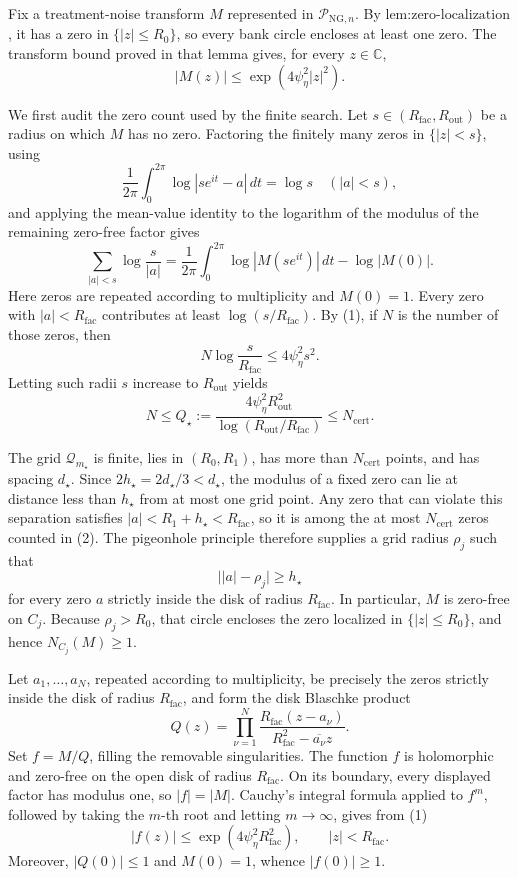 Fix a treatment-noise transform \(M\) represented in \(\mathcal P_{\mathrm{NG},n}\).  By \(\text{lem:zero-localization}\), it has a zero in \(\{|z|\le R_0\}\), so every bank circle encloses at least one zero.  The transform bound proved in that lemma gives, for every \(z\in\mathbb C\),
\[
 |M(z)|\le \exp(4\psi_{\eta}^2|z|^2). \tag{1}
\]

We first audit the zero count used by the finite search.  Let \(s\in(R_{\mathrm{fac}},R_{\mathrm{out}})\) be a radius on which \(M\) has no zero.  Factoring the finitely many zeros in \(\{|z|<s\}\), using
\[
 \frac1{2\pi}\int_0^{2\pi}\log|se^{it}-a|\,dt=\log s
 \quad (|a|<s),
\]
and applying the mean-value identity to the logarithm of the modulus of the remaining zero-free factor gives
\[
 \sum_{|a|<s}\log\frac{s}{|a|}
 =\frac1{2\pi}\int_0^{2\pi}\log|M(se^{it})|\,dt-\log|M(0)|.
\]
Here zeros are repeated according to multiplicity and \(M(0)=1\).  Every zero with \(|a|<R_{\mathrm{fac}}\) contributes at least \(\log(s/R_{\mathrm{fac}})\).  By (1), if \(N\) is the number of those zeros, then
\[
 N\log\frac{s}{R_{\mathrm{fac}}}
 \le4\psi_{\eta}^2s^2.
\]
Letting such radii \(s\) increase to \(R_{\mathrm{out}}\) yields
\[
 N\le
 Q_{\star}:=
 \frac{4\psi_{\eta}^2R_{\mathrm{out}}^2}
      {\log(R_{\mathrm{out}}/R_{\mathrm{fac}})}
 \le N_{\mathrm{cert}}. \tag{2}
\]

The grid \(\mathcal Q_{m_{\star}}\) is finite, lies in \((R_0,R_1)\), has more than \(N_{\mathrm{cert}}\) points, and has spacing \(d_{\star}\).  Since \(2h_{\star}=2d_{\star}/3<d_{\star}\), the modulus of a fixed zero can lie at distance less than \(h_{\star}\) from at most one grid point.  Any zero that can violate this separation satisfies \(|a|<R_1+h_{\star}<R_{\mathrm{fac}}\), so it is among the at most \(N_{\mathrm{cert}}\) zeros counted in (2).  The pigeonhole principle therefore supplies a grid radius \(\rho_j\) such that
\[
 \bigl||a|-\rho_j\bigr|\ge h_{\star} \tag{3}
\]
for every zero \(a\) strictly inside the disk of radius \(R_{\mathrm{fac}}\).  In particular, \(M\) is zero-free on \(C_j\).  Because \(\rho_j>R_0\), that circle encloses the zero localized in \(\{|z|\le R_0\}\), and hence \(N_{C_j}(M)\ge1\).

Let \(a_1,\ldots,a_N\), repeated according to multiplicity, be precisely the zeros strictly inside the disk of radius \(R_{\mathrm{fac}}\), and form the disk Blaschke product
\[
 Q(z)=\prod_{\nu=1}^N
 \frac{R_{\mathrm{fac}}(z-a_\nu)}
      {R_{\mathrm{fac}}^2-\overline{a_\nu}z}.
\]
Set \(f=M/Q\), filling the removable singularities.  The function \(f\) is holomorphic and zero-free on the open disk of radius \(R_{\mathrm{fac}}\).  On its boundary, every displayed factor has modulus one, so \(|f|=|M|\).  Cauchy's integral formula applied to \(f^m\), followed by taking the \(m\)-th root and letting \(m\to\infty\), gives from (1)
\[
 |f(z)|\le \exp(4\psi_{\eta}^2R_{\mathrm{fac}}^2),
 \qquad |z|<R_{\mathrm{fac}}. \tag{4}
\]
Moreover, \(|Q(0)|\le1\) and \(M(0)=1\), whence \(|f(0)|\ge1\).

